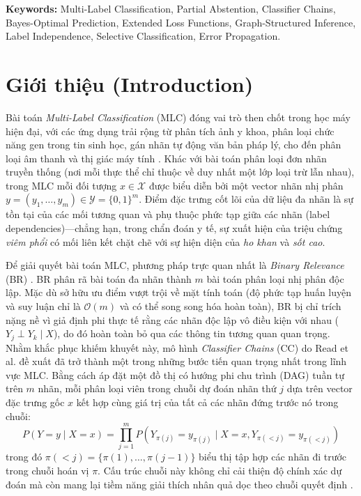 \documentclass[11pt,a4paper]{article}
\begin{document}
\vspace{0.3cm}
\noindent \textbf{Keywords:} Multi-Label Classification, Partial Abstention, Classifier Chains, Bayes-Optimal Prediction, Extended Loss Functions, Graph-Structured Inference, Label Independence, Selective Classification, Error Propagation.

\newpage
\section{Giới thiệu (Introduction)}
\label{sec:introduction}

Bài toán \textit{Multi-Label Classification} (MLC) đóng vai trò then chốt trong học máy hiện đại, với các ứng dụng trải rộng từ phân tích ảnh y khoa, phân loại chức năng gen trong tin sinh học, gán nhãn tự động văn bản pháp lý, cho đến phân loại âm thanh và thị giác máy tính \cite{tsoumakas2007multi, zhang2013review}. Khác với bài toán phân loại đơn nhãn truyền thống (nơi mỗi thực thể chỉ thuộc về duy nhất một lớp loại trừ lẫn nhau), trong MLC mỗi đối tượng $x \in \mathcal{X}$ được biểu diễn bởi một vector nhãn nhị phân $y = (y_1, \dots, y_m) \in \mathcal{Y} = \{0, 1\}^m$. Điểm đặc trưng cốt lõi của dữ liệu đa nhãn là sự tồn tại của các mối tương quan và phụ thuộc phức tạp giữa các nhãn (label dependencies)---chẳng hạn, trong chẩn đoán y tế, sự xuất hiện của triệu chứng \textit{viêm phổi} có mối liên kết chặt chẽ với sự hiện diện của \textit{ho khan} và \textit{sốt cao}.

Để giải quyết bài toán MLC, phương pháp trực quan nhất là \textit{Binary Relevance} (BR) \cite{luaces2012binary}. BR phân rã bài toán đa nhãn thành $m$ bài toán phân loại nhị phân độc lập. Mặc dù sở hữu ưu điểm vượt trội về mặt tính toán (độ phức tạp huấn luyện và suy luận chỉ là $\mathcal{O}(m)$ và có thể song song hóa hoàn toàn), BR bị chỉ trích nặng nề vì giả định phi thực tế rằng các nhãn độc lập vô điều kiện với nhau ($Y_j \perp Y_k \mid X$), do đó hoàn toàn bỏ qua các thông tin tương quan quan trọng. Nhằm khắc phục khiếm khuyết này, mô hình \textit{Classifier Chains} (CC) do Read et al. \cite{read2011classifier} đề xuất đã trở thành một trong những bước tiến quan trọng nhất trong lĩnh vực MLC. Bằng cách áp đặt một đồ thị có hướng phi chu trình (DAG) tuần tự trên $m$ nhãn, mỗi phân loại viên trong chuỗi dự đoán nhãn thứ $j$ dựa trên vector đặc trưng gốc $x$ kết hợp cùng giá trị của tất cả các nhãn đứng trước nó trong chuỗi:
\begin{equation}
P(Y = y \mid X = x) = \prod_{j=1}^m P(Y_{\pi(j)} = y_{\pi(j)} \mid X = x, Y_{\pi(< j)} = y_{\pi(< j)})
\label{eq:cc_chain_factorization}
\end{equation}
trong đó $\pi(< j) = \{\pi(1), \dots, \pi(j-1)\}$ biểu thị tập hợp các nhãn đi trước trong chuỗi hoán vị $\pi$. Cấu trúc chuỗi này không chỉ cải thiện độ chính xác dự đoán mà còn mang lại tiềm năng giải thích nhân quả dọc theo chuỗi quyết định \cite{read2011classifier, dembczynski2012bayes}.
\end{document}
